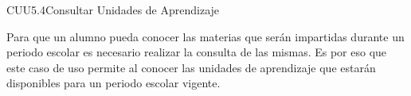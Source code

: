 \begin{UseCase}{CUU5.4}{Consultar Unidades de Aprendizaje}
	{
		Para que un alumno pueda conocer las materias que serán impartidas durante un periodo escolar es necesario realizar la consulta de las mismas. Es por eso que este caso de uso permite al  conocer las unidades de aprendizaje que estarán disponibles para un periodo escolar vigente.
			
		}
		
		
		

\end{UseCase}
